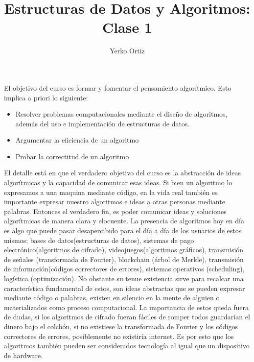 \documentclass[12pt]{article}
\begin{document}
\title{Estructuras de Datos y Algoritmos: Clase 1}
\author{Yerko Ortiz}

\maketitle
\flushleft
\justifying
{}

\tableofcontents

El objetivo del curso es formar y fomentar el pensamiento algorítmico. Esto implica a priori lo siguiente:
\begin{itemize}
    \item Resolver problemas computacionales mediante el diseño de algoritmos, además del uso e implementación de estructuras de datos.
    \item Argumentar la eficiencia de un algoritmo
    \item Probar la correctitud de un algoritmo
\end{itemize}
El detalle está en que el verdadero objetivo del curso es la abstracción de ideas algorítmicas y la capacidad de comunicar esas ideas. Si bien un algoritmo lo expresamos a una maquina mediante código, en la vida real también es importante expresar nuestro algoritmos e ideas a otras personas mediante palabras. Entonces el verdadero fin, es poder comunicar ideas y soluciones algorítmicas de manera clara y elocuente.
\newline
\newline
La presencia de algoritmos hoy en día es algo que puede pasar desapercibido para el día a día de los usuarios de estos mismos; bases de datos(estructuras de datos), sistemas de pago electrónico(algoritmos de cifrado), videojuegos(algoritmos gráficos), transmisión de señales (transformada de Fourier), blockchain (árbol de Merkle), transmisión de información(códigos correctores de errores), sistemas operativos (scheduling), logística (optimización). No obstante su tenue existencia sirve para recalcar una característica fundamental de estos, son ideas abstractas que se pueden expresar mediante código o palabras, existen en silencio en la mente de alguien o materializados como proceso computacional. La importancia de estos queda fuera de dudas, si los algoritmos de cifrado fueran fáciles de romper todos guardarían el dinero bajo el colchón, si no existiese la transformada de Fourier y los códigos correctores de errores, posiblemente no existiría internet. Es por esto que los algoritmos también pueden ser considerados tecnología al igual que un dispositivo de hardware.
\end{document}
